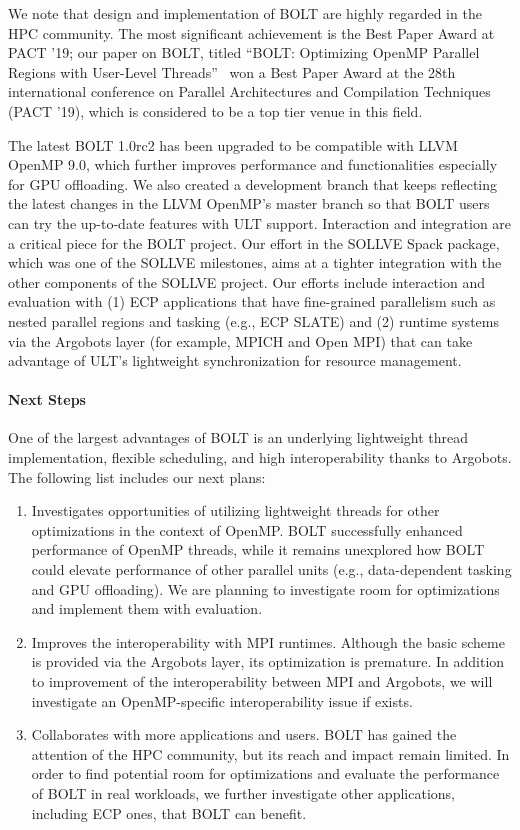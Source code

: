 We note that design and implementation of BOLT are highly regarded in
the HPC community. The most significant achievement is the Best Paper
Award at PACT '19; our paper on BOLT, titled ``BOLT: Optimizing OpenMP
Parallel Regions with User-Level Threads''~\cite{BOLT} won a Best
Paper Award at the 28th international conference on Parallel
Architectures and Compilation Techniques (PACT '19), which is
considered to be a top tier venue in this field.

The latest BOLT 1.0rc2 has been upgraded to be compatible with LLVM
OpenMP 9.0, which further improves performance and functionalities
especially for GPU offloading. We also created a development branch
that keeps reflecting the latest changes in the LLVM OpenMP's master
branch so that BOLT users can try the up-to-date features with ULT
support. Interaction and integration are a critical piece for the BOLT
project. Our effort in the SOLLVE Spack package, which was one of the
SOLLVE milestones, aims at a tighter integration with the other
components of the SOLLVE project. Our efforts include interaction and
evaluation with (1) ECP applications that have fine-grained
parallelism such as nested parallel regions and tasking (e.g., ECP
SLATE) and (2) runtime systems via the Argobots layer (for example,
MPICH and Open MPI) that can take advantage of ULT's lightweight
synchronization for resource management.

\paragraph{Next Steps}

One of the largest advantages of BOLT is an underlying lightweight
thread implementation, flexible scheduling, and high interoperability
thanks to Argobots. The following list includes our next plans:

\begin{enumerate}

\item Investigates opportunities of utilizing lightweight threads for
other optimizations in the context of OpenMP. BOLT successfully
enhanced performance of OpenMP threads, while it remains unexplored
how BOLT could elevate performance of other parallel units (e.g.,
data-dependent tasking and GPU offloading). We are planning to
investigate room for optimizations and implement them with
evaluation.

\item Improves the interoperability with MPI runtimes. Although the
basic scheme is provided via the Argobots layer, its optimization is
premature. In addition to improvement of the interoperability between
MPI and Argobots, we will investigate an OpenMP-specific
interoperability issue if exists.

\item Collaborates with more applications and users. BOLT has gained
the attention of the HPC community, but its reach and impact remain
limited. In order to find potential room for optimizations and
evaluate the performance of BOLT in real workloads, we further
investigate other applications, including ECP ones, that BOLT can
benefit.

\end{enumerate}

